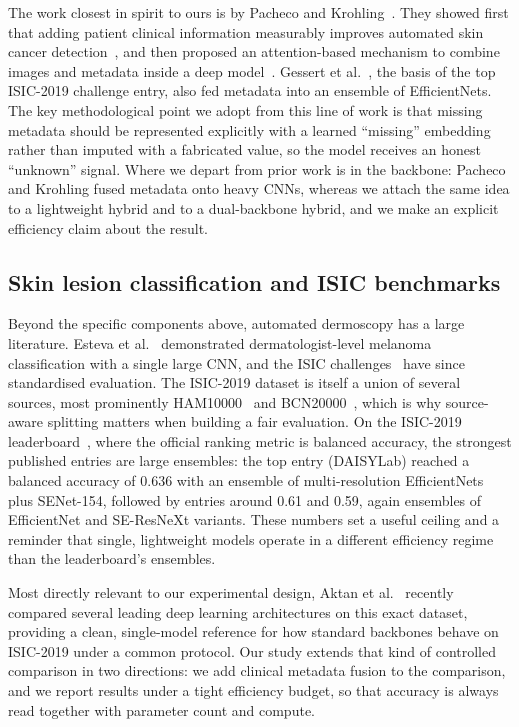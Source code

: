 The work closest in spirit to ours is by Pacheco and
Krohling~\cite{pacheco2020impact,pacheco2021attention}. They showed first that
adding patient clinical information measurably improves automated skin cancer
detection~\cite{pacheco2020impact}, and then proposed an attention-based
mechanism to combine images and metadata inside a deep
model~\cite{pacheco2021attention}. Gessert et al.~\cite{gessert2020ensembles},
the basis of the top ISIC-2019 challenge entry, also fed metadata into an
ensemble of EfficientNets. The key methodological point we adopt from this line
of work is that missing metadata should be represented explicitly with a
learned ``missing'' embedding rather than imputed with a fabricated value,
so the model receives an honest ``unknown'' signal. Where we depart from prior
work is in the backbone: Pacheco and Krohling fused metadata onto heavy CNNs,
whereas we attach the same idea to a lightweight hybrid and to a dual-backbone
hybrid, and we make an explicit efficiency claim about the result.

\subsection{Skin lesion classification and ISIC benchmarks}

Beyond the specific components above, automated dermoscopy has a large
literature. Esteva et al.~\cite{esteva2017dermatologist} demonstrated
dermatologist-level melanoma classification with a single large CNN, and the
ISIC challenges~\cite{codella2018skin} have since standardised evaluation. The
ISIC-2019 dataset is itself a union of several sources, most prominently
HAM10000~\cite{tschandl2018ham10000} and BCN20000~\cite{isic2019challenge},
which is why source-aware splitting matters when building a fair evaluation. On
the ISIC-2019 leaderboard~\cite{isic2019leaderboard}, where the official ranking
metric is balanced accuracy, the strongest published entries are large
ensembles: the top entry (DAISYLab) reached a balanced accuracy of 0.636 with an
ensemble of multi-resolution EfficientNets plus SENet-154, followed by entries
around 0.61 and 0.59, again ensembles of EfficientNet and SE-ResNeXt variants.
These numbers set a useful ceiling and a reminder that single, lightweight
models operate in a different efficiency regime than the leaderboard's
ensembles.

Most directly relevant to our experimental design, Aktan et
al.~\cite{aktan2025comparison} recently compared several leading deep learning
architectures on this exact dataset, providing a clean, single-model reference
for how standard backbones behave on ISIC-2019 under a common protocol. Our
study extends that kind of controlled comparison in two directions: we add
clinical metadata fusion to the comparison, and we report results under a tight
efficiency budget, so that accuracy is always read together with parameter count
and compute.

